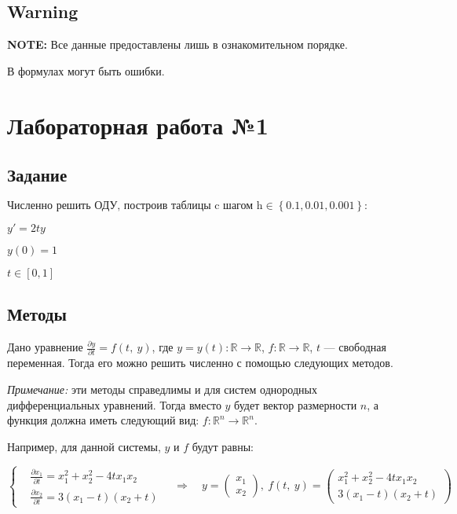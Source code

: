 \documentclass[12pt, a4paper]{article}
\begin{document}
\subsection{Warning}

\textbf{NOTE:} Все данные предоставлены лишь в ознакомительном порядке.

В формулах могут быть ошибки.


\section{Лабораторная работа №1}

\subsection{Задание}
$ \text{Численно решить ОДУ, построив таблицы c шагом h} \in \left\{ 0.1, 0.01, 0.001 \right\} : $

$ y' = 2ty $

$ y(0) = 1 $

$ t \in [0,1] $

\subsection{Методы}

Дано уравнение $\frac{\partial y}{\partial t} = f(t,\ y)$, где $y = y(t) : \mathbb{R}\to \mathbb{R}$, $f : \mathbb{R}\to \mathbb{R}$, $t$ --- свободная переменная. Тогда его можно решить численно с помощью следующих методов.

\textit{Примечание:} эти методы справедлимы и для систем однородных дифференциальных уравнений. Тогда вместо $y$ будет вектор размерности $n$, а функция должна иметь следующий вид: $f: \mathbb{R}^n\to \mathbb{R}^n$.

Например, для данной системы, $y$ и $f$ будут равны:

$$ \left\{
\begin{aligned}
&\frac{\partial x_1}{\partial t} = x_1^2 + x_2^2 - 4 t x_1 x_2  \\
&\frac{\partial x_2}{\partial t} = 3(x_1-t)(x_2+t) 
\end{aligned}
\right.\quad\Rightarrow\quad y = \begin{pmatrix}x_1\\ x_2 \end{pmatrix},\ f(t,\ y) = 
\begin{pmatrix}
x_1^2 + x_2^2 - 4 t x_1 x_2  \\
3(x_1-t)(x_2+t) 
\end{pmatrix} $$
\end{document}
